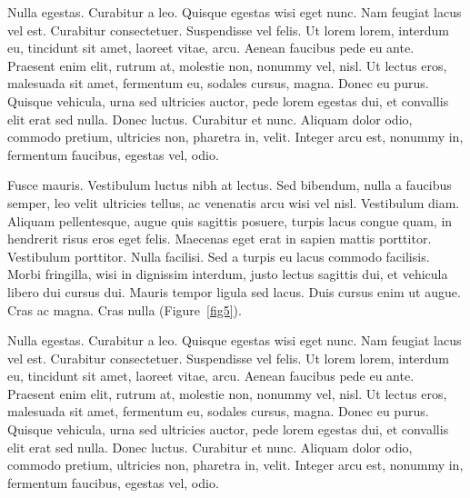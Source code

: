 \documentclass[APA,Times1COL]{WileyNJDv5} %
\begin{document}
Nulla egestas. Curabitur a leo. Quisque egestas wisi eget nunc. Nam feugiat lacus vel est. Curabitur consectetuer.
Suspendisse vel felis. Ut lorem lorem, interdum eu, tincidunt sit amet, laoreet vitae, arcu. Aenean faucibus pede eu
ante. Praesent enim elit, rutrum at, molestie non, nonummy vel, nisl. Ut lectus eros, malesuada sit amet, fermentum
eu, sodales cursus, magna. Donec eu purus. Quisque vehicula, urna sed ultricies auctor, pede lorem egestas dui, et
convallis elit erat sed nulla. Donec luctus. Curabitur et nunc. Aliquam dolor odio, commodo pretium, ultricies non,
pharetra in, velit. Integer arcu est, nonummy in, fermentum faucibus, egestas vel, odio.

%
\vspace*{12pt}
Fusce mauris. Vestibulum luctus nibh at lectus. Sed bibendum, nulla a faucibus semper, leo velit ultricies tellus, ac
venenatis arcu wisi vel nisl. Vestibulum diam. Aliquam pellentesque, augue quis sagittis posuere, turpis lacus congue
quam, in hendrerit risus eros eget felis. Maecenas eget erat in sapien mattis porttitor. Vestibulum porttitor. Nulla
facilisi. Sed a turpis eu lacus commodo facilisis. Morbi fringilla, wisi in dignissim interdum, justo lectus sagittis dui, et
vehicula libero dui cursus dui. Mauris tempor ligula sed lacus. Duis cursus enim ut augue. Cras ac magna. Cras nulla (Figure~\ref{fig5}).

Nulla egestas. Curabitur a leo. Quisque egestas wisi eget nunc. Nam feugiat lacus vel est. Curabitur consectetuer.
Suspendisse vel felis. Ut lorem lorem, interdum eu, tincidunt sit amet, laoreet vitae, arcu. Aenean faucibus pede eu
ante. Praesent enim elit, rutrum at, molestie non, nonummy vel, nisl. Ut lectus eros, malesuada sit amet, fermentum
eu, sodales cursus, magna. Donec eu purus. Quisque vehicula, urna sed ultricies auctor, pede lorem egestas dui, et
convallis elit erat sed nulla. Donec luctus. Curabitur et nunc. Aliquam dolor odio, commodo pretium, ultricies non,
pharetra in, velit. Integer arcu est, nonummy in, fermentum faucibus, egestas vel, odio.
\end{document}
